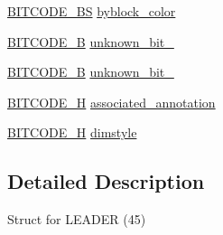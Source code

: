 \begin{DoxyCompactItemize}
\item 
\hyperlink{dwg_8h_a94297606fbd4a4ff97e8add284af0809}{\-B\-I\-T\-C\-O\-D\-E\-\_\-\-B\-S} \hyperlink{struct__dwg__entity__LEADER_afcdbe3222f81c204db9af2fef52a7e4e}{byblock\-\_\-color}
\item 
\hyperlink{dwg_8h_ab533b1f62d9086749e3bb5b67e9f224e}{\-B\-I\-T\-C\-O\-D\-E\-\_\-\-B} \hyperlink{struct__dwg__entity__LEADER_ac8e856fde427bb6b298507be8ab6b6d7}{unknown\-\_\-bit\-\_}
\item 
\hyperlink{dwg_8h_ab533b1f62d9086749e3bb5b67e9f224e}{\-B\-I\-T\-C\-O\-D\-E\-\_\-\-B} \hyperlink{struct__dwg__entity__LEADER_a0c2bbce5f40c7627e43b9f954e69a4fe}{unknown\-\_\-bit\-\_}
\item 
\hyperlink{dwg_8h_a7c700e94e047a97ba8c24bdfe4029dc3}{\-B\-I\-T\-C\-O\-D\-E\-\_\-\-H} \hyperlink{struct__dwg__entity__LEADER_a1ea2b50da897b5dbfeec5c4c8d0db7f9}{associated\-\_\-annotation}
\item 
\hyperlink{dwg_8h_a7c700e94e047a97ba8c24bdfe4029dc3}{\-B\-I\-T\-C\-O\-D\-E\-\_\-\-H} \hyperlink{struct__dwg__entity__LEADER_af3b13a54dac734e5fb268c159774f30f}{dimstyle}
\end{DoxyCompactItemize}


\subsection{\-Detailed \-Description}
\-Struct for \-L\-E\-A\-D\-E\-R (45) 

